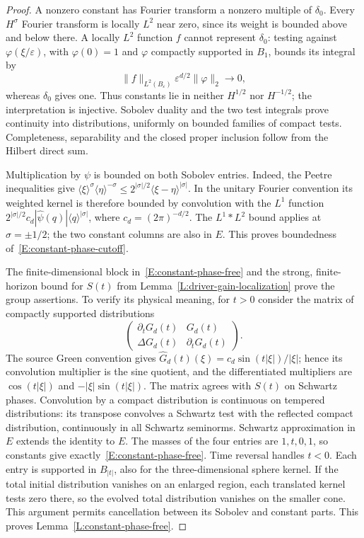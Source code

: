 \begin{proof}
  A nonzero constant has Fourier transform a nonzero multiple of
  $\delta_0$. Every $H^\sigma$ Fourier transform is locally $L^2$
  near zero, since its weight is bounded above and below there.
  A locally $L^2$ function $f$ cannot represent $\delta_0$: testing
  against $\varphi(\xi/\varepsilon)$, with $\varphi(0)=1$ and
  $\varphi$ compactly supported in $B_1$, bounds its integral by
  \[
    \|f\|_{L^2(B_\varepsilon)}
    \varepsilon^{d/2}\|\varphi\|_2\longrightarrow0,
  \]
  whereas $\delta_0$ gives one. Thus constants lie in neither
  $H^{1/2}$ nor $H^{-1/2}$; the interpretation is injective.
  Sobolev duality and the two test integrals prove continuity into
  distributions, uniformly on bounded families of compact tests.
  Completeness, separability and the closed proper inclusion follow
  from the Hilbert direct sum.

  Multiplication by $\psi$ is bounded on both Sobolev entries.
  Indeed, the Peetre inequalities give
  $\langle\xi\rangle^\sigma\langle\eta\rangle^{-\sigma}
  \le2^{|\sigma|/2}\langle\xi-\eta\rangle^{|\sigma|}$.
  In the unitary Fourier convention its weighted kernel is therefore
  bounded by convolution with the $L^1$ function
  $2^{|\sigma|/2}c_d|\widehat\psi(q)|\langle q\rangle^{|\sigma|}$,
  where $c_d=(2\pi)^{-d/2}$. The $L^1*L^2$ bound applies at
  $\sigma=\pm1/2$; the two constant columns are also in $E$.
  This proves boundedness of~\eqref{E:constant-phase-cutoff}.

  The finite-dimensional block in~\eqref{E:constant-phase-free} and
  the strong, finite-horizon bound for $S(t)$ from
  Lemma~\ref{L:driver-gain-localization} prove the group assertions.
  To verify its physical meaning, for $t>0$ consider the matrix of
  compactly supported distributions
  \[
    \begin{pmatrix}
      \partial_tG_d(t)&G_d(t)\\
      \Delta G_d(t)&\partial_tG_d(t)
    \end{pmatrix}.
  \]
  The source Green convention gives
  $\widehat G_d(t)(\xi)=c_d\sin(t|\xi|)/|\xi|$; hence its convolution
  multiplier is the sine quotient, and the differentiated multipliers
  are $\cos(t|\xi|)$ and $-|\xi|\sin(t|\xi|)$.
  The matrix agrees with $S(t)$ on Schwartz phases. Convolution by a
  compact distribution is continuous on tempered distributions:
  its transpose convolves a Schwartz test with the reflected compact
  distribution, continuously in all Schwartz seminorms. Schwartz
  approximation in $E$ extends the identity to $E$.
  The masses of the four entries are $1,t,0,1$, so constants give
  exactly~\eqref{E:constant-phase-free}. Time reversal handles $t<0$.
  Each entry is supported in $B_{|t|}$, also for the three-dimensional
  sphere kernel. If the total initial distribution vanishes on an
  enlarged region, each translated kernel tests zero there, so the
  evolved total distribution vanishes on the smaller cone. This
  argument permits cancellation between its Sobolev and constant parts.
  This proves Lemma~\ref{L:constant-phase-free}.
\end{proof}

